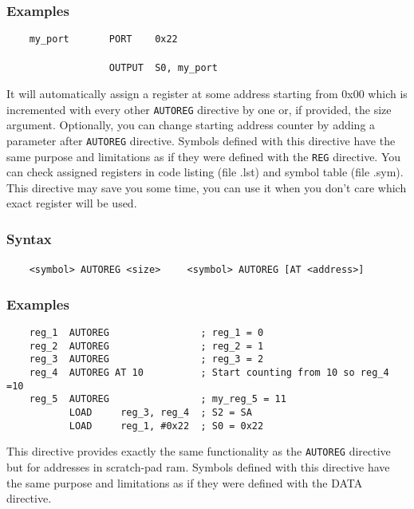         \subsubsection{Examples}
            \verb'    my_port       PORT    0x22'\\
            \verb''\\
            \verb'                  OUTPUT  S0, my_port'

    \clearpage
        It will automatically assign a register at some address starting from 0x00 which is incremented with every other \texttt{AUTOREG} directive by one or, if provided, the size argument. Optionally, you can change starting address counter by adding a parameter after \texttt{AUTOREG} directive. Symbols defined with this directive have the same purpose and limitations as if they were defined with the \texttt{REG} directive. You can check assigned registers in code listing (file .lst) and symbol table (file .sym). This directive may save you some time, you can use it when you don't care which exact register will be used.

        \subsubsection{Syntax}
            \verb'    <symbol> AUTOREG <size>'
            \verb'    <symbol> AUTOREG [AT <address>]'

        \subsubsection{Examples}
            \verb'    reg_1  AUTOREG                ; reg_1 = 0'\\
            \verb'    reg_2  AUTOREG                ; reg_2 = 1'\\
            \verb'    reg_3  AUTOREG                ; reg_3 = 2'\\
            \verb'    reg_4  AUTOREG AT 10          ; Start counting from 10 so reg_4 =10'\\
            \verb'    reg_5  AUTOREG                ; my_reg_5 = 11'
            \verb''\\
            \verb'           LOAD     reg_3, reg_4  ; S2 = SA'\\
            \verb'           LOAD     reg_1, #0x22  ; S0 = 0x22'

        This directive provides exactly the same functionality as the \texttt{AUTOREG} directive but for addresses in scratch-pad ram. Symbols defined with this directive have the same purpose and limitations as if they were defined with the DATA directive.

